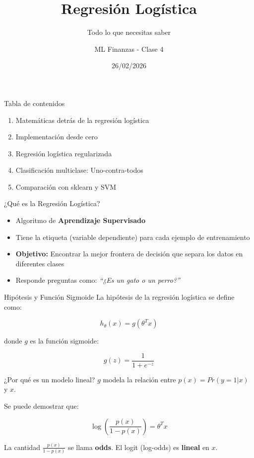 \documentclass[
  ignorenonframetext,
]{beamer}
\title{Regresión Logística}
\subtitle{Todo lo que necesitas saber}
\author{ML Finanzas - Clase 4}
\date{26/02/2026}
\providecommand{\tightlist}{%
  \setlength{\itemsep}{0pt}\setlength{\parskip}{0pt}}
\begin{document}
\frame{\titlepage}

\begin{frame}
\begin{block}{Tabla de contenidos}
\label{tabla-de-contenidos}
\begin{enumerate}
\tightlist
\item
  Matemáticas detrás de la regresión logística
\item
  Implementación desde cero
\item
  Regresión logística regularizada
\item
  Clasificación multiclase: Uno-contra-todos
\item
  Comparación con sklearn y SVM
\end{enumerate}
\end{block}
\end{frame}

\begin{frame}
\begin{block}{¿Qué es la Regresión Logística?}
\label{quuxe9-es-la-regresiuxf3n-loguxedstica}
\begin{itemize}
\tightlist
\item
  Algoritmo de \textbf{Aprendizaje Supervisado}
\item
  Tiene la etiqueta (variable dependiente) para cada ejemplo de
  entrenamiento
\item
  \textbf{Objetivo:} Encontrar la mejor frontera de decisión que separa
  los datos en diferentes clases
\item
  Responde preguntas como: \emph{``¿Es un gato o un perro?''}
\end{itemize}
\end{block}
\end{frame}

\begin{frame}
\begin{block}{Hipótesis y Función Sigmoide}
\label{hipuxf3tesis-y-funciuxf3n-sigmoide}
La hipótesis de la regresión logística se define como:

\[h_\theta(x) = g(\theta^Tx)\]

donde \(g\) es la función sigmoide:

\[g(z) = \frac{1}{1+e^{-z}}\]
\end{block}
\end{frame}

\begin{frame}
\begin{block}{¿Por qué es un modelo lineal?}
\label{por-quuxe9-es-un-modelo-lineal}
\(g\) modela la relación entre \(p(x) = Pr(y=1|x)\) y \(x\).

Se puede demostrar que:

\[\log\left(\frac{p(x)}{1 - p(x)}\right) = \theta^Tx\]

La cantidad \(\frac{p(x)}{1 - p(x)}\) se llama \textbf{odds}. El logit
(log-odds) es \textbf{lineal} en \(x\).
\end{block}
\end{frame}
\end{document}
